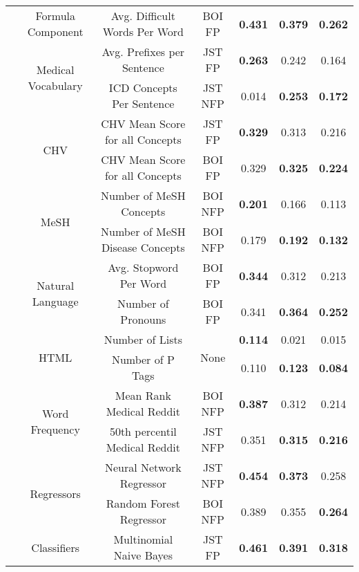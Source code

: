 \begin{table}[t]
{\begin{tabular}{c|c|c|c|c|c|c}
\cmidrule{2-7} 
 & Formula Component & Avg. Difficult Words Per Word & BOI FP & \textbf{0.431} & \textbf{0.379} & \textbf{0.262}\tabularnewline
\cmidrule{2-7} 
 & \multirow{2}{*}{Medical Vocabulary} & Avg. Prefixes per Sentence & JST FP & \textbf{0.263} & 0.242 & 0.164\tabularnewline
 &  & ICD Concepts Per Sentence & JST NFP & 0.014 & \textbf{0.253} & \textbf{0.172}\tabularnewline
\cmidrule{2-7} 
 & \multirow{2}{*}{CHV} & CHV Mean Score for all Concepts & JST FP & \textbf{0.329} & 0.313 & 0.216\tabularnewline
 &  & CHV Mean Score for all Concepts & BOI FP & 0.329 & \textbf{0.325} & \textbf{0.224}\tabularnewline
\cmidrule{2-7} 
 & \multirow{2}{*}{MeSH} & Number of MeSH Concepts & BOI NFP & \textbf{0.201} & 0.166 & 0.113\tabularnewline
 &  & Number of MeSH Disease Concepts & BOI NFP & 0.179 & \textbf{0.192} & \textbf{0.132}\tabularnewline
\cmidrule{2-7} 
 & \multirow{2}{*}{Natural Language} & Avg. Stopword Per Word & BOI FP & \textbf{0.344} & 0.312 & 0.213\tabularnewline
 &  & Number of Pronouns & BOI FP & 0.341 & \textbf{0.364} & \textbf{0.252}\tabularnewline
\cmidrule{2-7} 
 & \multirow{2}{*}{HTML} & Number of Lists & \multirow{2}{*}{None} & \textbf{0.114} & 0.021 & 0.015\tabularnewline
 &  & Number of P Tags &  & 0.110 & \textbf{0.123} & \textbf{0.084}\tabularnewline
\cmidrule{2-7} 
 & \multirow{2}{*}{Word Frequency} & Mean Rank Medical Reddit & BOI NFP & \textbf{0.387} & 0.312 & 0.214\tabularnewline
 &  & 50th percentil Medical Reddit & JST NFP & 0.351 & \textbf{0.315} & \textbf{0.216}\tabularnewline
\cmidrule{2-7} 
 & \multirow{2}{*}{Regressors} & Neural Network Regressor & JST NFP & \textbf{0.454} & \textbf{0.373} & 0.258\tabularnewline
 &  & Random Forest Regressor & BOI NFP & 0.389 & 0.355 & \textbf{0.264}\tabularnewline
\cmidrule{2-7} 
 & Classifiers & Multinomial Naive Bayes & JST FP & \textbf{0.461} & \textbf{0.391} & \textbf{0.318}\tabularnewline
\bottomrule
\end{tabular}
} %
\end{table}
